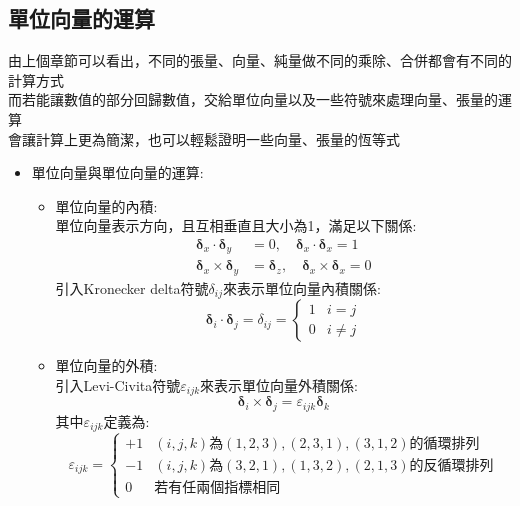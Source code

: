 \documentclass[../main.tex]{subfiles}
\begin{document}
\subsection{單位向量的運算}
由上個章節可以看出，不同的張量、向量、純量做不同的乘除、合併都會有不同的計算方式\\
而若能讓數值的部分回歸數值，交給單位向量以及一些符號來處理向量、張量的運算\\
會讓計算上更為簡潔，也可以輕鬆證明一些向量、張量的恆等式
\begin{itemize}
  \item 單位向量與單位向量的運算:
    \begin{itemize}
      \item 單位向量的內積:\\
        單位向量表示方向，且互相垂直且大小為1，滿足以下關係:
          \begin{align}
            \bm \delta_x \cdot \bm \delta_y &= 0, \quad \bm \delta_x \cdot \bm \delta_x = 1 \nonumber \\
            \bm \delta_x \times \bm \delta_y &= \bm \delta_z, \quad \bm \delta_x \times \bm \delta_x = 0
          \end{align}
        引入Kronecker delta符號$\delta_{ij}$來表示單位向量內積關係:
        \begin{equation}
          \boxed{\bm \delta_i \cdot \bm \delta_j = \delta_{ij} = \begin{cases}
            1 & i=j \\
            0 & i \neq j
          \end{cases}}
        \end{equation}
      \item 單位向量的外積:\\
        引入Levi-Civita符號$\varepsilon_{ijk}$來表示單位向量外積關係:
        \begin{equation}
          \boxed{\bm \delta_i \times \bm \delta_j = \varepsilon_{ijk} \bm \delta_k}
        \end{equation}
        其中$\varepsilon_{ijk}$定義為:
        \begin{equation}
          \varepsilon_{ijk} = \begin{cases}
            +1 & (i,j,k)\text{為}(1,2,3),(2,3,1),(3,1,2)\text{的循環排列}\\
            -1 & (i,j,k)\text{為}(3,2,1),(1,3,2),(2,1,3)\text{的反循環排列}\\
            0 & \text{若有任兩個指標相同}
          \end{cases}

\end{equation}
\end{itemize}
\end{itemize}
\end{document}
